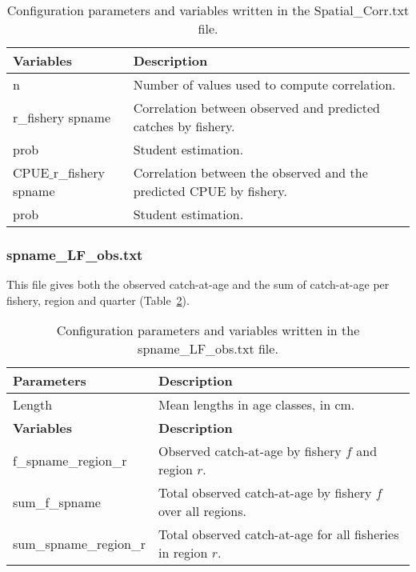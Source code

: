 \begin{center}
\begin{table}[H]
\caption{Configuration parameters and variables written in the {\ttfamily Spatial\_Corr.txt} file.}
\begin{tabular}{p{4cm}p{11.75cm}}
    \hline
    {\bfseries Variables} & {\bfseries Description}\\ \hline\hline
    {\ttfamily n}  & Number of values used to compute correlation. \\ \hline
    {\ttfamily r\_fishery spname}  & Correlation between observed and predicted catches by fishery. \\ \hline
    {\ttfamily prob}  & Student estimation. \\ \hline
    {\ttfamily CPUE$\_$r\_fishery spname}  & Correlation between the observed and the predicted CPUE by fishery.\\\hline
    {\ttfamily prob}  & Student estimation. \\
    \hline
\end{tabular}
\label{tab:variablesCORR}
\end{table}
\end{center}

\subsubsection{{\ttfamily spname\_LF\_obs.txt}}
This file gives both the observed catch-at-age and the sum of catch-at-age per fishery, region and quarter (Table~\ref{tab:LFobs}). 

\begin{center}
\begin{table}[H]
\caption{Configuration parameters and variables written in the {\ttfamily spname\_LF\_obs.txt} file.}
\raggedleft
\begin{tabular}{p{4cm}p{11.75cm}}
    \hline
    {\bfseries Parameters} & {\bfseries Description}\\ \hline\hline 
    {\ttfamily Length} & Mean lengths in age classes, in cm. \\\hline
    {\bfseries Variables} & {\bfseries Description}\\ \hline\hline 
    {\ttfamily f\_spname\_region\_r}  & Observed catch-at-age by fishery $f$ and region $r$.\\ \hline
    {\ttfamily sum\_f\_spname}  & Total observed catch-at-age by fishery $f$ over all regions.\\ \hline
    {\ttfamily sum\_spname\_region\_r}  & Total  observed catch-at-age for all fisheries in region $r$.\\
    \hline
\end{tabular}
\label{tab:LFobs}
\end{table}
\end{center}


